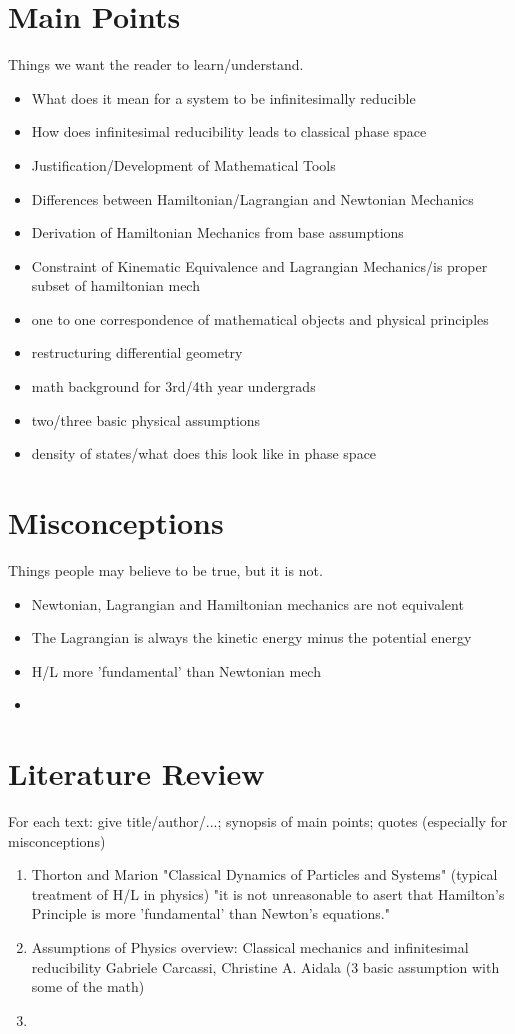 \documentclass{article}
\begin{document}
\section{Main Points}
Things we want the reader to learn/understand.

\begin{itemize}
	\item What does it mean for a system to be infinitesimally reducible
	\item How does infinitesimal reducibility leads to classical phase space

\item Justification/Development of Mathematical Tools
\item Differences between Hamiltonian/Lagrangian and Newtonian Mechanics
\item Derivation of Hamiltonian Mechanics from base assumptions
\item Constraint of Kinematic Equivalence and Lagrangian Mechanics/is proper subset of hamiltonian mech
\item one to one correspondence of mathematical objects and physical principles
\item restructuring differential geometry
\item math background for 3rd/4th year undergrads
\item two/three basic physical assumptions
\item density of states/what does this look like in phase space
\end{itemize}


\section{Misconceptions}
Things people may believe to be true, but it is not.

\begin{itemize}
	\item Newtonian, Lagrangian and Hamiltonian mechanics are not equivalent
	\item The Lagrangian is always the kinetic energy minus the potential energy 
	\item H/L more 'fundamental' than Newtonian mech
\item 
\end{itemize}

\section{Literature Review}
For each text: give title/author/...; synopsis of main points; quotes (especially for misconceptions)

\begin{enumerate}
\item Thorton and Marion "Classical Dynamics of Particles and Systems"
(typical treatment of H/L in physics)
"it is not unreasonable to asert that Hamilton's Principle is more 'fundamental' than Newton's equations."
\item Assumptions of Physics overview:
Classical mechanics and infinitesimal reducibility
Gabriele Carcassi, Christine A. Aidala (3 basic assumption with some of the math)
\item 
\end{enumerate}
\end{document}
